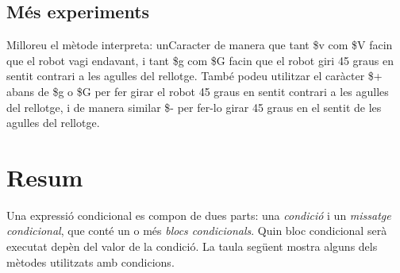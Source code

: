 \subsection{Més experiments}
Milloreu el mètode \textsf{interpreta: unCaracter} de manera que tant \textsf{\$v} com \textsf{\$V} facin que el robot vagi endavant, i tant \textsf{\$g} com \textsf{\$G} facin que el robot giri 45 graus en sentit contrari a les agulles del rellotge. També podeu utilitzar el caràcter \textsf{\$+} abans de \textsf{\$g} o \textsf{\$G} per fer girar el robot 45 graus en sentit contrari a les agulles del rellotge, i de manera similar \textsf{\$-} per fer-lo girar 45 graus en el sentit de les agulles del rellotge.
\newpage
\section{Resum}
Una expressió condicional es compon de dues parts: una \emph{condició} i un \emph{missatge condicional}, que conté un o més \emph{blocs condicionals}. Quin bloc condicional serà executat depèn del valor de la condició. La taula següent mostra alguns dels mètodes utilitzats amb condicions.

